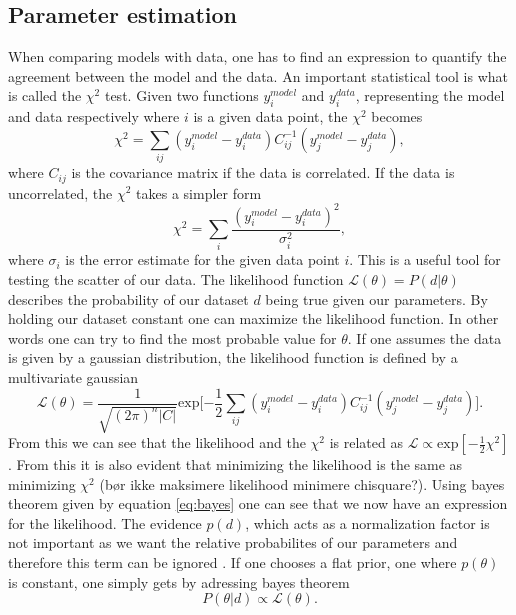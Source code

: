 \subsection{Parameter estimation}
When comparing models with data, one has to find an expression to quantify the
agreement between the model and the data. An important statistical tool is what
is called the $\chi^2$ test. Given two functions $y^{model}_i$ and $y^{data}_i$,
representing the model and data respectively where $i$ is a given data point,
the $\chi^2$ becomes
\begin{equation}
    \chi^2=\sum_{ij}(y^{model}_i-y^{data}_i)C_{ij}^{-1}(y^{model}_j-y^{data}_j),
\end{equation}
where $C_{ij}$ is the covariance matrix if the data is correlated. If the data
is uncorrelated, the $\chi^2$ takes a simpler form
\begin{equation}
    \chi^2=\sum_{i}\frac{(y^{model}_i-y^{data}_i)^2}{\sigma_i^2},
\end{equation}
where $\sigma_i$ is the error estimate for the given data point $i$. This is a
useful tool for testing the scatter of our data. The likelihood function
$\mathcal{L}(\theta)=P(d\vert \theta)$ describes the probability of our dataset
$d$ being true given our parameters. By holding our dataset constant one can
maximize the likelihood function. In other words one can try to find the most
probable value for $\theta$. If one assumes the data is given by a gaussian
distribution, the likelihood function is defined by a multivariate gaussian
\begin{equation}
    \mathcal{L}(\theta) = \frac{1}{\sqrt{(2\pi)^n\vert C \vert}}\mathrm{exp}\big[{-\frac{1}{2}}\sum_{ij}(y^{model}_i-y^{data}_i)C_{ij}^{-1}(y^{model}_j-y^{data}_j)\big].
\end{equation}
From this we can see that the likelihood and the $\chi^2$ is related as
$\mathcal{L}\propto \mathrm{exp}[-\frac{1}{2}\chi^2]$. From this it is also evident that
minimizing the likelihood is the same as minimizing $\chi^2$ (bør ikke maksimere
likelihood minimere chisquare?). Using bayes theorem given by equation
\ref{eq:bayes} one can see that we now have an expression for the likelihood.
The evidence $p(d)$, which acts as a normalization factor is not important as we
want the relative probabilites of our parameters and therefore this term can be
ignored \cite{heavens2010statistical}. If one chooses a flat prior, one where
$p(\theta)$ is constant, one simply gets by adressing bayes theorem
\begin{equation}
    P(\theta\vert d) \propto \mathcal{L}(\theta).
\end{equation}

